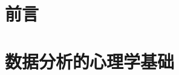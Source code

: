 \documentclass{article}
\title{}
\author{作者}
\begin{document}
\thispagestyle{empty}



\pagestyle{headings}

\chapter*{ 前\qquad 言} 


\renewcommand{\thepage}{\Roman{page}}
\tableofcontents


\mainmatter

\chapter{数据分析的心理学基础}

\end{document}
